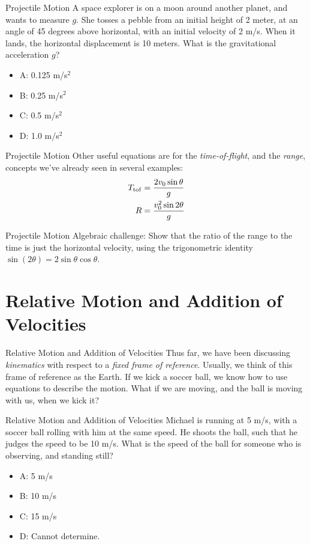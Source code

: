 \documentclass{beamer}
\begin{document}
\begin{frame}{Projectile Motion}
A space explorer is on a moon around another planet, and wants to measure $g$.  She tosses a pebble from an initial height of 2 meter, at an angle of 45 degrees above horizontal, with an initial velocity of 2 m/s.  When it lands, the horizontal displacement is 10 meters.  What is the gravitational acceleration $g$?
\begin{itemize}
\item A: 0.125 m/s$^2$
\item B: 0.25 m/s$^2$
\item C: 0.5 m/s$^2$
\item D: 1.0 m/s$^2$
\end{itemize}
\end{frame}

\begin{frame}{Projectile Motion}
Other useful equations are for the \textit{time-of-flight}, and the \textit{range}, concepts we've already seen in several examples: \\
\begin{align}
T_{\rm tof} &= \frac{2v_{\rm 0}\sin\theta}{g} \\
R &= \frac{v_{\rm 0}^2\sin2\theta}{g}
\end{align}
\end{frame}

\begin{frame}{Projectile Motion}
\alert{Algebraic challenge}: Show that the ratio of the range to the time is just the horizontal velocity, using the trigonometric identity $\sin(2\theta) = 2\sin\theta\cos\theta$.
\end{frame}

\section{Relative Motion and Addition of Velocities}

\begin{frame}{Relative Motion and Addition of Velocities}
Thus far, we have been discussing \textit{kinematics} with respect to a \textit{fixed frame of reference}.  Usually, we think of this frame of reference as the Earth.  If we kick a soccer ball, we know how to use equations to describe the motion.  What if we are moving, and the ball is moving with us, when we kick it?
\end{frame}

\begin{frame}{Relative Motion and Addition of Velocities}
Michael is running at 5 m/s, with a soccer ball rolling with him at the same speed.  He shoots the ball, such that he judges the speed to be 10 m/s.  What is the speed of the ball for someone who is observing, and standing still?
\begin{itemize}
\item A: 5 m/s
\item B: 10 m/s
\item C: 15 m/s
\item D: Cannot determine.
\end{itemize}
\end{frame}
\end{document}
